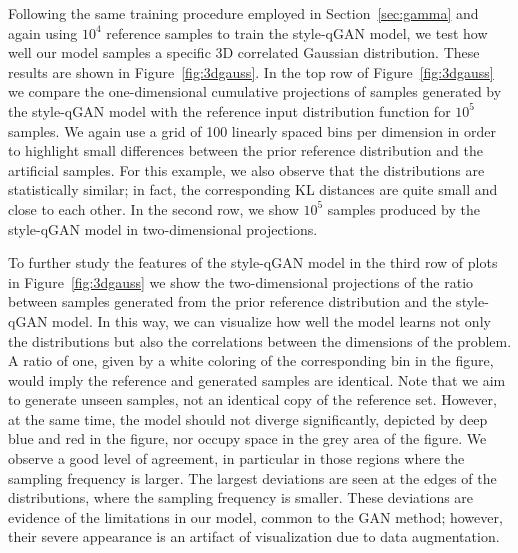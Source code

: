 \documentclass[twocolumn,preprintnumbers,superscriptaddress]{revtex4-2}
\begin{document}
Following the same training procedure employed in Section~\ref{sec:gamma} and again using $10^4$ reference samples to train the style-qGAN model, we test how well our model samples a specific 3D correlated Gaussian distribution. These results are shown in Figure~\ref{fig:3dgauss}. In the top row of Figure~\ref{fig:3dgauss} we compare the one-dimensional cumulative projections of samples generated by the style-qGAN model with the reference input distribution function for $10^5$ samples. We again use a grid of 100 linearly spaced bins per dimension in order to highlight small differences between the prior reference distribution and the artificial samples.  For this example, we also observe that the distributions are statistically similar; in fact, the corresponding KL distances are quite small and close to each other. In the second row, we show $10^5$ samples produced by the style-qGAN model in two-dimensional projections. 

To further study the features of the style-qGAN model in the third row of plots in Figure~\ref{fig:3dgauss} we show the two-dimensional projections of the ratio between samples generated from the prior reference distribution and the style-qGAN model.
In this way, we can visualize how well the model learns not only the distributions but also the correlations between the dimensions of the problem. A ratio of one, given by a white coloring of the corresponding bin in the figure, would imply the reference and generated samples are identical. Note that we aim to generate unseen samples, not an identical copy of the reference set. However, at the same time, the model should not diverge significantly, depicted by deep blue and red in the figure, nor occupy space in the grey area of the figure.  We observe a good level of agreement, in particular in those regions where the sampling frequency is larger. The largest deviations are seen at the edges of the distributions, where the sampling frequency is smaller. These deviations are evidence of the limitations in our model, common to the GAN method; however, their severe appearance is an artifact of visualization due to data augmentation. 
\end{document}

